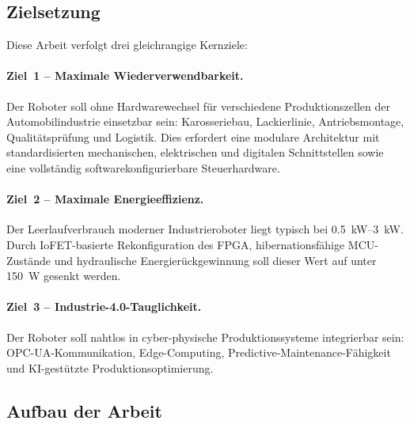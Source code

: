 ﻿\documentclass[a4paper,12pt]{scrreprt}
\theoremstyle{definition}
\begin{document}
\subsection{Zielsetzung}

Diese Arbeit verfolgt drei gleichrangige Kernziele:

\paragraph{Ziel~1 -- Maximale Wiederverwendbarkeit.}
Der Roboter soll ohne Hardwarewechsel für verschiedene Produktionszellen
der Automobilindustrie einsetzbar sein: Karosseriebau, Lackierlinie,
Antriebsmontage, Qualitätsprüfung und Logistik. Dies erfordert eine
modulare Architektur mit standardisierten mechanischen, elektrischen und
digitalen Schnittstellen sowie eine vollständig softwarekonfigurierbare
Steuerhardware.

\paragraph{Ziel~2 -- Maximale Energieeffizienz.}
Der Leerlaufverbrauch moderner Industrieroboter liegt typisch bei
\SIrange{0.5}{3}{\kilo\watt}. Durch IoFET-basierte Rekonfiguration
des FPGA, hibernationsfähige MCU-Zustände und hydraulische
Energierückgewinnung soll dieser Wert auf unter \SI{150}{\watt}
gesenkt werden.

\paragraph{Ziel~3 -- Industrie-4.0-Tauglichkeit.}
Der Roboter soll nahtlos in cyber-physische Produktionssysteme
integrierbar sein: OPC-UA-Kommunikation, Edge-Computing,
Predictive-Maintenance-Fähigkeit und KI-gestützte
Produktionsoptimierung.

\subsection{Aufbau der Arbeit}
\end{document}
